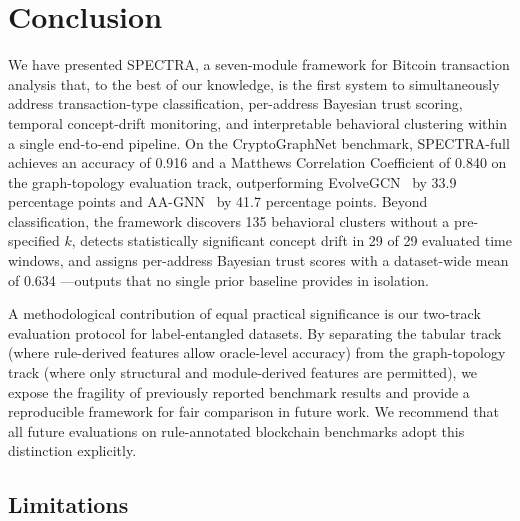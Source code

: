 \documentclass[journal]{IEEEtran}
\begin{document}
%


\section{Conclusion}
\label{sec:conclusion}

We have presented \textsc{SPECTRA}, a seven-module framework for Bitcoin
transaction analysis that, to the best of our knowledge, is the first system
to simultaneously address transaction-type classification, per-address
Bayesian trust scoring, temporal concept-drift monitoring, and interpretable
behavioral clustering within a single end-to-end pipeline.
On the CryptoGraphNet benchmark, SPECTRA-full achieves an accuracy of
\num{0.916} and a Matthews Correlation Coefficient of \num{0.840} on the
graph-topology evaluation track, outperforming EvolveGCN~\cite{Pareja2020}
by \num{33.9} percentage points and AA-GNN~\cite{Zhou2020} by
\num{41.7} percentage points.
Beyond classification, the framework discovers \num{135} behavioral
clusters without a pre-specified $k$, detects statistically significant
concept drift in \num{29} of \num{29} evaluated time windows, and assigns
per-address Bayesian trust scores with a dataset-wide mean of \num{0.634}
---outputs that no single prior baseline provides in isolation.

A methodological contribution of equal practical significance is our
two-track evaluation protocol for label-entangled datasets.
By separating the tabular track (where rule-derived features allow oracle-level
accuracy) from the graph-topology track (where only structural and
module-derived features are permitted), we expose the fragility of
previously reported benchmark results and provide a reproducible framework
for fair comparison in future work.
We recommend that all future evaluations on rule-annotated blockchain
benchmarks adopt this distinction explicitly.

\subsection*{Limitations}
\end{document}
